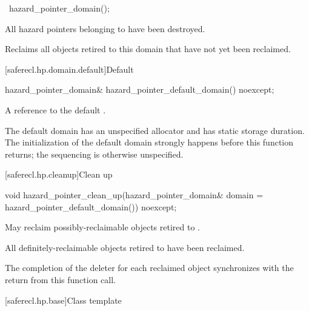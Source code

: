 \begin{itemdecl}
~hazard_pointer_domain();
\end{itemdecl}

\begin{itemdescr}

\pnum
\expects
All hazard pointers belonging to  have been destroyed.

\pnum
\effects
Reclaims all objects retired to this domain that have not yet been reclaimed.

\end{itemdescr}

[saferecl.hp.domain.default]{Default }

\begin{itemdecl}
hazard_pointer_domain& hazard_pointer_default_domain() noexcept;
\end{itemdecl}

\begin{itemdescr}

\pnum
\returns 
A reference to the default .

\pnum
\remarks 
The default domain has an unspecified allocator and has static storage
duration. The initialization of the default domain strongly happens before this function
returns; the sequencing is otherwise unspecified.

\end{itemdescr}

[saferecl.hp.cleanup]{Clean up}

\begin{itemdecl}
void hazard_pointer_clean_up(hazard_pointer_domain& domain = hazard_pointer_default_domain())
  noexcept;
\end{itemdecl}

\begin{itemdescr}

\pnum
\effects 
May reclaim possibly-reclaimable objects retired to .

\pnum
\ensures 
All definitely-reclaimable objects retired to  have been reclaimed.

\pnum
\sync 
The completion of the deleter for each reclaimed object synchronizes with the return from this function call.

\end{itemdescr}

[saferecl.hp.base]{Class template }

